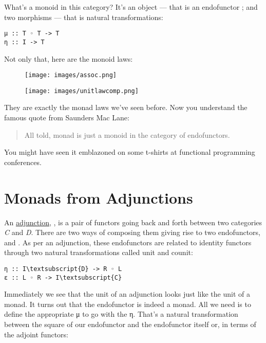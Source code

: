 What's a monoid in this category? It's an object --- that is an
endofunctor ; and two morphisms --- that is natural
transformations:

\begin{Verbatim}[commandchars=\\\{\}]
μ :: T ◦ T -> T
η :: I -> T
\end{Verbatim}
Not only that, here are the monoid laws:

\begin{figure}[H]
\centering
\texttt{[image: images/assoc.png]}
\end{figure}

\begin{figure}[H]
\centering
\texttt{[image: images/unitlawcomp.png]}
\end{figure}

\noindent
They are exactly the monad laws we've seen before. Now you understand
the famous quote from Saunders Mac Lane:

\begin{quote}
All told, monad is just a monoid in the category of endofunctors.
\end{quote}
You might have seen it emblazoned on some t-shirts at functional
programming conferences.

\section{Monads from Adjunctions}\label{monads-from-adjunctions}

An \hyperref[adjunctions]{adjunction},
, is a pair of functors going back and forth between two
categories \emph{C} and \emph{D}. There are two ways of composing them
giving rise to two endofunctors,  and .
As per an adjunction, these endofunctors are related to identity
functors through two natural transformations called unit and counit:

\begin{Verbatim}[commandchars=\\\{\}]
η :: I\textsubscript{D} -> R ◦ L
ε :: L ◦ R -> I\textsubscript{C}
\end{Verbatim}
Immediately we see that the unit of an adjunction looks just like the
unit of a monad. It turns out that the endofunctor  is
indeed a monad. All we need is to define the appropriate μ to go with
the η. That's a natural transformation between the square of our
endofunctor and the endofunctor itself or, in terms of the adjoint
functors:


